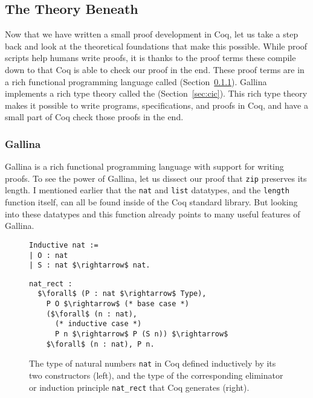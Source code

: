 \subsection{The Theory Beneath}
\label{sec:mot-theory}

Now that we have written a small proof development in Coq, let us take a step back and look at the theoretical foundations that make this possible.
While proof scripts help humans write proofs, it is thanks to the proof terms these compile down to that Coq is able to check our proof in the end.
These proof terms are in a rich functional programming language called  (Section~\ref{sec:gallina}).
Gallina implements a rich type theory called the  (Section~\ref{sec:cic}).
This rich type theory makes it possible to write programs, specifications, and proofs in Coq,
and have a small part of Coq check those proofs in the end.

\subsubsection{Gallina}
\label{sec:gallina}

Gallina is a rich functional programming language with support for writing proofs.
To see the power of Gallina, let us dissect our proof that \lstinline{zip} preserves its length.
I mentioned earlier that the \lstinline{nat} and \lstinline{list} datatypes,
and the \lstinline{length} function itself, can all be found inside of the Coq standard library.
But looking into these datatypes and this function already points to many useful features of Gallina.

\begin{figure}
\begin{minipage}{0.30\textwidth}
\begin{lstlisting}
Inductive nat :=
| O : nat
| S : nat $\rightarrow$ nat.
\end{lstlisting}
\end{minipage}
\hfill
\begin{minipage}{0.68\textwidth}
\begin{lstlisting}
nat_rect :
  $\forall$ (P : nat $\rightarrow$ Type),
    P O $\rightarrow$ (* base case *)
    ($\forall$ (n : nat),
      (* inductive case *)
      P n $\rightarrow$ P (S n)) $\rightarrow$
    $\forall$ (n : nat), P n.
\end{lstlisting}
\end{minipage}
\caption{The type of natural numbers \lstinline{nat} in Coq defined inductively by its two constructors (left), and the type of the corresponding eliminator or induction principle \lstinline{nat_rect} that Coq generates (right).}
\label{fig:nat}
\end{figure}

